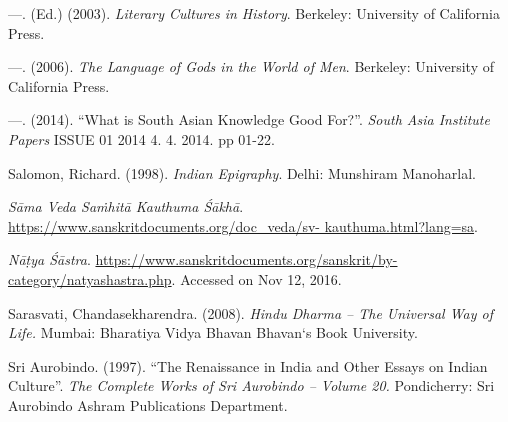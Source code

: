 \begin{thebibliography}{99}
  —. (Ed.) (2003). \textit{Literary Cultures in History}. Berkeley: University of California Press.

  —. (2006). \textit{The Language of Gods in the World of Men}. Berkeley: University of California Press.

  —. (2014). “What is South Asian Knowledge Good For?”. \textit{South Asia Institute Papers} ISSUE 01 2014 4. 4. 2014. pp 01-22.

  Salomon, Richard. (1998). \textit{Indian Epigraphy}. Delhi: Munshiram Manoharlal.

  \textit{Sāma Veda Saṁhitā Kauthuma Śākhā}. \url{https://www.sanskritdocuments.org/doc_veda/sv- kauthuma.html?lang=sa}.

  \textit{Nāṭya Śāstra}. \url{https://www.sanskritdocuments.org/sanskrit/by-category/natyashastra.php}. Accessed on Nov 12, 2016.

  Sarasvati, Chandasekharendra. (2008). \textit{Hindu Dharma – The Universal Way of Life.} Mumbai: Bharatiya Vidya Bhavan Bhavan‘s Book University.

  Sri Aurobindo. (1997). “The Renaissance in India and Other Essays on Indian Culture”. \textit{The Complete Works of Sri Aurobindo – Volume 20.} Pondicherry: Sri Aurobindo Ashram Publications Department.

 \end{thebibliography}

